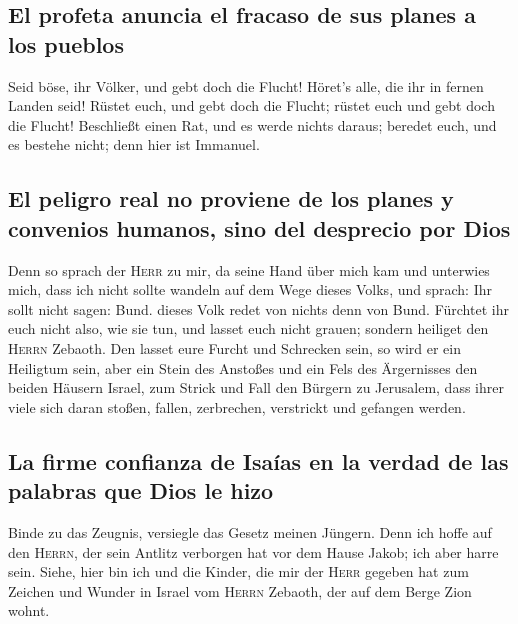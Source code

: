 \hypertarget{el-profeta-anuncia-el-fracaso-de-sus-planes-a-los-pueblos}{%
\subsection{El profeta anuncia el fracaso de sus planes a los
pueblos}\label{el-profeta-anuncia-el-fracaso-de-sus-planes-a-los-pueblos}}

 Seid böse, ihr Völker, und gebt doch die Flucht! Höret's
alle, die ihr in fernen Landen seid! Rüstet euch, und gebt doch die
Flucht; rüstet euch und gebt doch die Flucht!  Beschließt
einen Rat, und es werde nichts daraus; beredet euch, und es bestehe
nicht; denn hier ist Immanuel.

\hypertarget{el-peligro-real-no-proviene-de-los-planes-y-convenios-humanos-sino-del-desprecio-por-dios}{%
\subsection{El peligro real no proviene de los planes y convenios
humanos, sino del desprecio por
Dios}\label{el-peligro-real-no-proviene-de-los-planes-y-convenios-humanos-sino-del-desprecio-por-dios}}

 Denn so sprach der \textsc{Herr} zu mir, da seine Hand
über mich kam und unterwies mich, dass ich nicht sollte wandeln auf dem
Wege dieses Volks, und sprach:  Ihr sollt nicht sagen:
Bund. dieses Volk redet von nichts denn von Bund. Fürchtet ihr euch
nicht also, wie sie tun, und lasset euch nicht grauen; 
sondern heiliget den \textsc{Herrn} Zebaoth. Den lasset eure Furcht und
Schrecken sein,  so wird er ein Heiligtum sein, aber ein
Stein des Anstoßes und ein Fels des Ärgernisses den beiden Häusern
Israel, zum Strick und Fall den Bürgern zu Jerusalem, 
dass ihrer viele sich daran stoßen, fallen, zerbrechen, verstrickt und
gefangen werden.

\hypertarget{la-firme-confianza-de-isauxedas-en-la-verdad-de-las-palabras-que-dios-le-hizo}{%
\subsection{La firme confianza de Isaías en la verdad de las palabras
que Dios le
hizo}\label{la-firme-confianza-de-isauxedas-en-la-verdad-de-las-palabras-que-dios-le-hizo}}

 Binde zu das Zeugnis, versiegle das Gesetz meinen
Jüngern.  Denn ich hoffe auf den \textsc{Herrn}, der sein
Antlitz verborgen hat vor dem Hause Jakob; ich aber harre sein.
 Siehe, hier bin ich und die Kinder, die mir der
\textsc{Herr} gegeben hat zum Zeichen und Wunder in Israel vom
\textsc{Herrn} Zebaoth, der auf dem Berge Zion wohnt.


